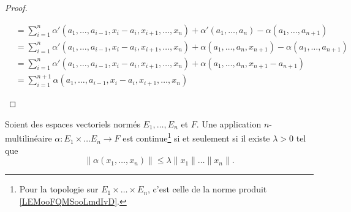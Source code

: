 \begin{proof}
\begin{subproof}
\begin{subequations}
\begin{align}
				 & =\sum_{i=1}^n\alpha'(a_1,\ldots,a_{i-1},x_i-a_i,x_{i+1},\ldots,x_n)+\alpha'(a_1,\ldots,a_n)-\alpha(a_1,\ldots,a_{n+1})        \\
				 & =\sum_{i=1}^n\alpha'(a_1,\ldots,a_{i-1},x_i-a_i,x_{i+1},\ldots,x_n)+\alpha(a_1,\ldots,a_n,x_{n+1})-\alpha(a_1,\ldots,a_{n+1}) \\
				 & =\sum_{i=1}^n\alpha'(a_1,\ldots,a_{i-1},x_i-a_i,x_{i+1},\ldots,x_n)+\alpha(a_1,\ldots,a_n,x_{n+1}-a_{n+1})                    \\
				 & =\sum_{i=1}^{n+1}\alpha(a_1,\ldots,a_{i-1},x_i-a_i,x_{i+1},\ldots,x_n)
			\end{align}
		\end{subequations}
	\end{subproof}
\end{proof}


\begin{proposition}	\label{PROPooDQBOooByBvmj}
	Soient des espaces vectoriels normés \( E_1,\ldots, E_n\) et \( F\). Une application \( n\)-multilinéaire \(\alpha \colon E_1\times \ldots E_n\to F  \) est continue\footnote{Pour la topologie sur \( E_1\times\ldots\times E_n\), c'est celle de la norme produit \ref{LEMooFQMSooLmdIvD}.} si et seulement si il existe \( \lambda>0\) tel que
	\begin{equation}		\label{EQooGTVEooZsvzAM}
		\| \alpha(x_1,\ldots,x_n) \|\leq \lambda \| x_1 \|\ldots \| x_n \|.
	\end{equation}
\end{proposition}

